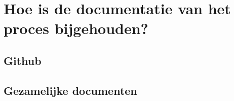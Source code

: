 \section{Hoe is de documentatie van het proces bijgehouden?}
\subsection{Github}
\subsection{Gezamelijke documenten}